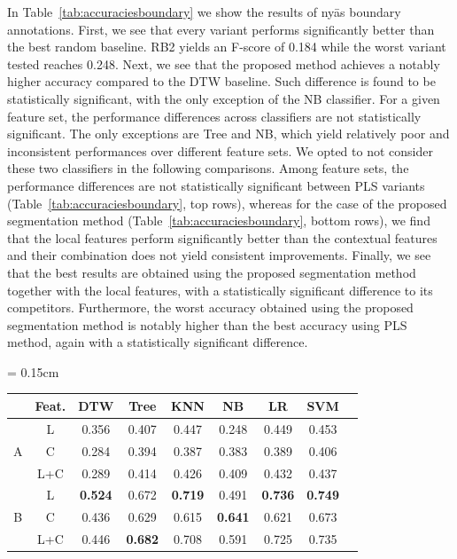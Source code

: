 {In Table~\ref{tab:accuraciesboundary} we show the results of ny\={a}s boundary annotations. First, we see that every variant performs significantly better than the best random baseline. RB2 yields an F-score of 0.184 while the worst variant tested reaches 0.248. Next, we see that the proposed method achieves a notably higher accuracy compared to the DTW baseline. Such difference is found to be statistically significant, with the only exception of the NB classifier. For a given feature set, the performance differences across classifiers are not statistically significant. The only exceptions are Tree and NB, which yield relatively poor and inconsistent performances over different feature sets. We opted to not consider these two classifiers in the following comparisons. Among  feature sets, the performance differences are not statistically significant between PLS variants (Table~\ref{tab:accuraciesboundary}, top rows), whereas for the case of the proposed segmentation method (Table~\ref{tab:accuraciesboundary}, bottom rows), we find that the local features perform significantly better than the contextual features and their combination does not yield consistent improvements. Finally, we see that the best results are obtained using the proposed segmentation method together with the local features, with a statistically significant difference to its competitors. Furthermore, the worst accuracy obtained using the proposed segmentation method is notably higher than the best accuracy using PLS method, again with a statistically significant difference.


\begin{table} 
	\centering
	\tabcolsep = 0.15cm
	\renewcommand{\arraystretch}{1.15}
	\begin{tabular}{ c|c|c| c c c c c c }
		
		\hline\hline
		& Feat.		&	DTW & Tree	 &	KNN 	&	NB		& LR 	&	SVM\\
		
		\hline
		\multirow{3}{*}{A} & 	L		&  0.356 & 0.407 & 0.447 & 0.248 & 0.449 & 0.453\\ 
		&	C		& 0.284 & 0.394 & 0.387 & 0.383 & 0.389 & 0.406 \\
		&	L+C		& 0.289 & 0.414 & 0.426 & 0.409 &0.432 & 0.437 \\
		\hline  		
		\multirow{3}{*}{B} &	L		& \textbf{0.524} & 0.672 & \textbf{0.719} & 0.491 & \textbf{0.736} & \textbf{0.749}\\ 
		&	C		& 0.436 & 0.629 & 0.615 & \textbf{0.641} & 0.621 & 0.673 \\
		&	L+C		& 0.446 & \textbf{0.682} & 0.708 & 0.591 & 0.725 & 0.735\\  		
		\hline\hline
		

\end{tabular}
\end{table}}
